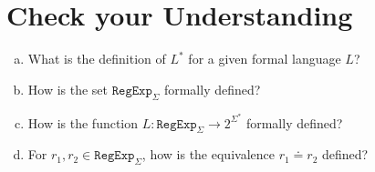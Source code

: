 \section{Check your Understanding}
\begin{enumerate}[(a)]
\item What is the definition of \( L^* \) for a given formal language \( L \)?
\item How is the set \( \texttt{RegExp}_\Sigma \) formally defined?
\item How is the function \( L: \texttt{RegExp}_\Sigma \rightarrow 2^{\Sigma^*} \) formally defined?
\item For \( r_1, r_2 \in \texttt{RegExp}_\Sigma \), how is the equivalence \( r_1 \doteq r_2 \) defined?
\end{enumerate}




